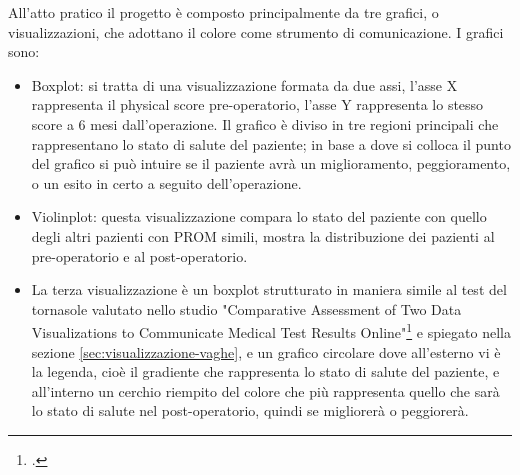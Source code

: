 All'atto pratico il progetto è composto principalmente da tre grafici, o visualizzazioni, che adottano il colore come strumento di comunicazione. I grafici sono: 
\begin{itemize}
    \item Boxplot: si tratta di una visualizzazione formata da due assi, l'asse X rappresenta il physical score pre-operatorio, l'asse Y rappresenta lo stesso score a 6 mesi dall'operazione. Il grafico è diviso in tre regioni principali che rappresentano lo stato di salute del paziente; in base a dove si colloca il punto del grafico si può intuire se il paziente avrà un miglioramento, peggioramento, o un esito in certo a seguito dell'operazione. 
    \item Violinplot: questa visualizzazione compara lo stato del paziente con quello degli altri pazienti con PROM simili, mostra la distribuzione dei pazienti al pre-operatorio e al post-operatorio. 
    \item La terza visualizzazione è un boxplot strutturato in maniera simile al test del tornasole valutato nello studio "Comparative Assessment of Two Data Visualizations to Communicate Medical Test Results Online"\footcite{womak:comparative-assesment} e spiegato nella sezione \ref*{sec:visualizzazione-vaghe}, e un grafico circolare dove all'esterno vi è la legenda, cioè il gradiente che rappresenta lo stato di salute del paziente, e all'interno un cerchio riempito del colore che più rappresenta quello che sarà lo stato di salute nel post-operatorio, quindi se migliorerà o peggiorerà. 
\end{itemize}

